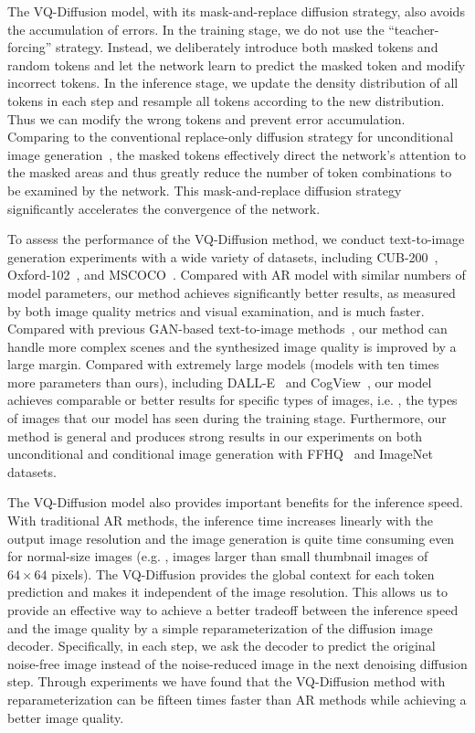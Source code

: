 The VQ-Diffusion model, with its mask-and-replace diffusion strategy, also avoids the accumulation of errors. In the training stage, we do not use the “teacher-forcing” strategy. Instead, we deliberately introduce both masked tokens and random tokens and let the network learn to predict the masked token and modify incorrect tokens. In the inference stage, we update the density distribution of all tokens in each step and resample all tokens according to the new distribution. Thus we can modify the wrong tokens and prevent error accumulation. Comparing to the conventional replace-only diffusion strategy for unconditional image generation~\cite{austin2021structured}, the masked tokens effectively direct the network’s attention to the masked areas and thus greatly reduce the number of token combinations to be examined by the network. This mask-and-replace diffusion strategy significantly accelerates the convergence of the network.

To assess the performance of the VQ-Diffusion method, we conduct text-to-image generation experiments with a wide variety of datasets, including CUB-200~\cite{wah2011caltech}, Oxford-102~\cite{nilsback2008automated}, and MSCOCO~\cite{lin2014microsoft}. Compared with AR model with similar numbers of model parameters, our method achieves significantly better results, as measured by both image quality metrics and visual examination, and is much faster. Compared with previous GAN-based text-to-image methods~\cite{xu2018attngan,zhang2017stackgan,zhang2018stackgan++,zhu2019dm}, our method can handle more complex scenes and the synthesized image quality is improved by a large margin. Compared with extremely large models (models with ten times more parameters than ours), including DALL-E~\cite{ramesh2021zero} and CogView~\cite{ding2021cogview}, our model achieves comparable or better results for specific types of images, i.e. , the types of images that our model has seen during the training stage. Furthermore, our method is general and produces strong results in our experiments on both unconditional and conditional image generation with FFHQ~\cite{karras2019style} and ImageNet~\cite{deng2009imagenet} datasets.

The VQ-Diffusion model also provides important benefits for the inference speed. With traditional AR methods, the inference time increases linearly with the output image resolution and the image generation is quite time consuming even for normal-size images (e.g. , images larger than small thumbnail images of $64 \times 64$ pixels). The VQ-Diffusion provides the global context for each token prediction and makes it independent of the image resolution. This allows us to provide an effective way to achieve a better tradeoff between the inference speed and the image quality by a simple reparameterization of the diffusion image decoder. Specifically, in each step, we ask the decoder to predict the original noise-free image instead of the noise-reduced image in the next denoising diffusion step. Through experiments we have found that the VQ-Diffusion method with reparameterization can be fifteen times faster than AR methods while achieving a better image quality.

